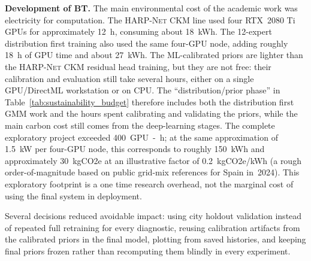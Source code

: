 \textbf{Development of BT.} The main environmental cost of the academic
work was electricity for computation. The \textsc{HARP-Net CKM} line used four RTX~2080
Ti GPUs for approximately \SI{12}{h}, consuming about \SI{18}{kWh}.
The 12-expert distribution first training also used the
same four-GPU node, adding roughly \SI{18}{h} of GPU time and about
\SI{27}{kWh}. The ML-calibrated priors are lighter than the \textsc{HARP-Net CKM} residual head
training, but they are not free: their calibration and evaluation still take
several hours, either on a single GPU/DirectML workstation or on CPU. The
``distribution/prior phase'' in Table~\ref{tab:sustainability_budget} therefore
includes both the distribution first GMM work and the hours spent calibrating
and validating the priors, while the main carbon cost still comes from the
deep-learning stages. The complete exploratory project exceeded
\SI{400}{GPU-h}; at the same approximation of \SI{1.5}{kW} per four-GPU node,
this corresponds to roughly \SI{150}{kWh} and approximately
\SI{30}{kgCO2e} at an illustrative factor of 0.2~kgCO2e/kWh (a rough
order-of-magnitude based on public grid-mix references for Spain in~2024).
This exploratory footprint is a one time research overhead, not the marginal
cost of using the final system in deployment.

Several decisions reduced avoidable impact: using city holdout validation
instead of repeated full retraining for every diagnostic, reusing calibration
artifacts from the calibrated priors in the final model, plotting from saved histories, and
keeping final priors frozen rather than recomputing them blindly in every
experiment.

